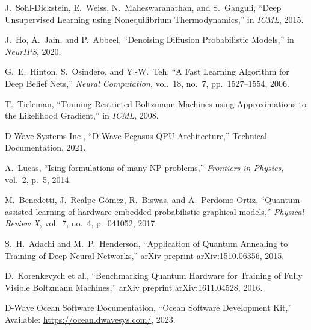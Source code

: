 \documentclass[11pt]{article}
\begin{document}
\begin{thebibliography}{20}\setlength{\itemsep}{2pt}

J.~Sohl-Dickstein, E.~Weiss, N.~Maheswaranathan, and S.~Ganguli,
``Deep Unsupervised Learning using Nonequilibrium Thermodynamics,''
in \emph{ICML}, 2015.

J.~Ho, A.~Jain, and P.~Abbeel,
``Denoising Diffusion Probabilistic Models,''
in \emph{NeurIPS}, 2020.

G.~E.~Hinton, S.~Osindero, and Y.-W.~Teh,
``A Fast Learning Algorithm for Deep Belief Nets,''
\emph{Neural Computation}, vol.~18, no.~7, pp.~1527--1554, 2006.

T.~Tieleman,
``Training Restricted Boltzmann Machines using Approximations to the Likelihood Gradient,''
in \emph{ICML}, 2008.

D-Wave Systems Inc.,
``D-Wave Pegasus QPU Architecture,''
Technical Documentation, 2021.

A.~Lucas,
``Ising formulations of many NP problems,''
\emph{Frontiers in Physics}, vol.~2, p.~5, 2014.

M.~Benedetti, J.~Realpe-G\'{o}mez, R.~Biswas, and A.~Perdomo-Ortiz,
``Quantum-assisted learning of hardware-embedded probabilistic graphical models,''
\emph{Physical Review X}, vol.~7, no.~4, p.~041052, 2017.

S.~H.~Adachi and M.~P.~Henderson,
``Application of Quantum Annealing to Training of Deep Neural Networks,''
arXiv preprint arXiv:1510.06356, 2015.

D.~Korenkevych et al.,
``Benchmarking Quantum Hardware for Training of Fully Visible Boltzmann Machines,''
arXiv preprint arXiv:1611.04528, 2016.

D-Wave Ocean Software Documentation,
``Ocean Software Development Kit,''
Available: \url{https://ocean.dwavesys.com/}, 2023.

\end{thebibliography}
\end{document}
